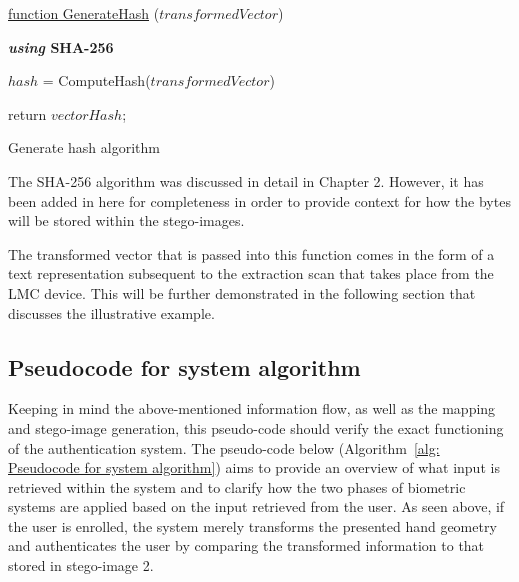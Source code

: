 \begin{algorithm}
     
     \underline{function GenerateHash} ($transformedVector$)\;
     
     \textbf{\textit{using} SHA-256}{
        $hash$ = ComputeHash($transformedVector$)\;
        
    
     }
     return $vectorHash$;
     \caption{Generate hash algorithm}
     \label{alg: Generate hash algorithm}
     
\end{algorithm}


The SHA-256 algorithm was discussed in detail in Chapter 2. However, it has been added in here for completeness in order to provide context for how the bytes will be stored within the stego-images. 

The transformed vector that is passed into this function comes in the form of a text representation subsequent to the extraction scan that takes place from the LMC device. This will be further demonstrated in the following section that discusses the illustrative example.


\subsection{Pseudocode for system algorithm}

Keeping in mind the above-mentioned information flow, as well as the mapping and stego-image generation, this pseudo-code should verify the exact functioning of the authentication system.
The pseudo-code below (Algorithm~\ref{alg: Pseudocode for system algorithm}) aims to provide an overview of what input is retrieved within the system and to clarify how the two phases of biometric systems are applied based on the input retrieved from the user. As seen above, if the user is enrolled, the system merely transforms the presented hand geometry and authenticates the user by comparing the transformed information to that stored in stego-image 2.

